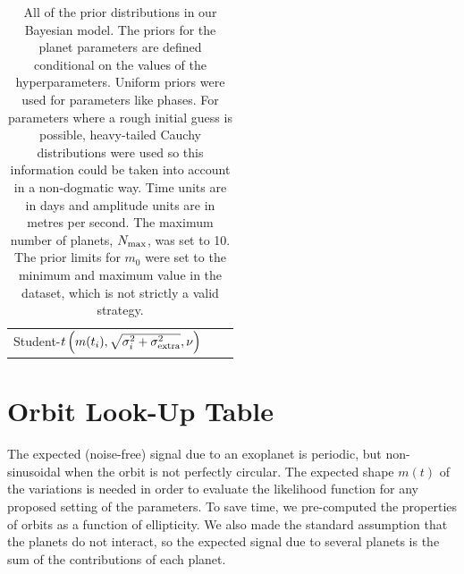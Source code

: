 \documentclass[useAMS,usenatbib]{mn2e}
\begin{document}
\begin{table}
\begin{tabular}{|l|l|l|}
		Student-$t\left(m(t_i), \sqrt{\sigma_i^2 + \sigma_{\rm extra}^2}, \nu\right)$
\end{tabular}
\caption{All of the prior distributions in our Bayesian model.
The priors for the planet parameters are defined conditional on the values
of the hyperparameters. Uniform priors were used for parameters like phases.
For parameters where a rough initial guess is possible, heavy-tailed Cauchy
distributions were used so this information could be taken into account
in a non-dogmatic way. Time units are in days and amplitude units are
in metres per second. The maximum number of planets, $N_{\rm max}$, was set
to 10. The prior limits for $m_0$ were set to the minimum and maximum value
in the dataset, which is not strictly a valid strategy.\label{tab:priors}}
\end{table}

\section{Orbit Look-Up Table}\label{sec:orbits}
The expected (noise-free) signal due to an exoplanet is periodic, but
non-sinusoidal when the orbit is not perfectly circular. The expected
shape $m(t)$ of the variations is needed in order to evaluate the likelihood
function for any proposed setting of the parameters.
To save time, we pre-computed the properties of orbits as a function of
ellipticity. We also made the standard assumption that the planets do not
interact, so the expected signal due to several planets is the sum of the
contributions of each planet.
\end{document}
